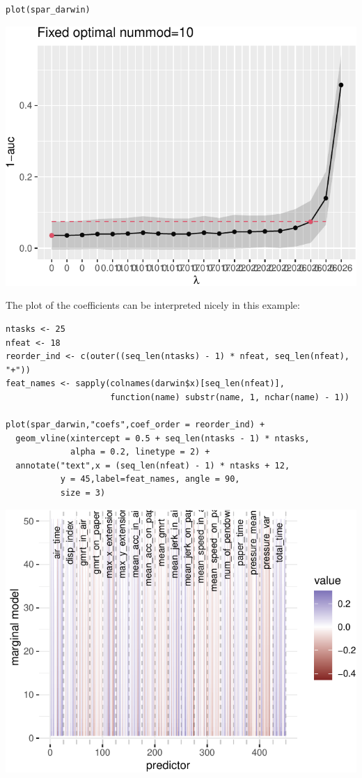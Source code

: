 \documentclass[
  article]{jss}
\begin{document}
\begin{verbatim}
plot(spar_darwin)
\end{verbatim}

\includegraphics{SPAR_files/figure-pdf/unnamed-chunk-16-1.pdf}

The plot of the coefficients can be interpreted nicely in this example:

\begin{verbatim}
ntasks <- 25
nfeat <- 18
reorder_ind <- c(outer((seq_len(ntasks) - 1) * nfeat, seq_len(nfeat), "+"))
feat_names <- sapply(colnames(darwin$x)[seq_len(nfeat)],
                     function(name) substr(name, 1, nchar(name) - 1))

plot(spar_darwin,"coefs",coef_order = reorder_ind) + 
  geom_vline(xintercept = 0.5 + seq_len(ntasks - 1) * ntasks, 
             alpha = 0.2, linetype = 2) +
  annotate("text",x = (seq_len(nfeat) - 1) * ntasks + 12,
           y = 45,label=feat_names, angle = 90,
           size = 3)
\end{verbatim}

\includegraphics{SPAR_files/figure-pdf/unnamed-chunk-17-1.pdf}
\end{document}
